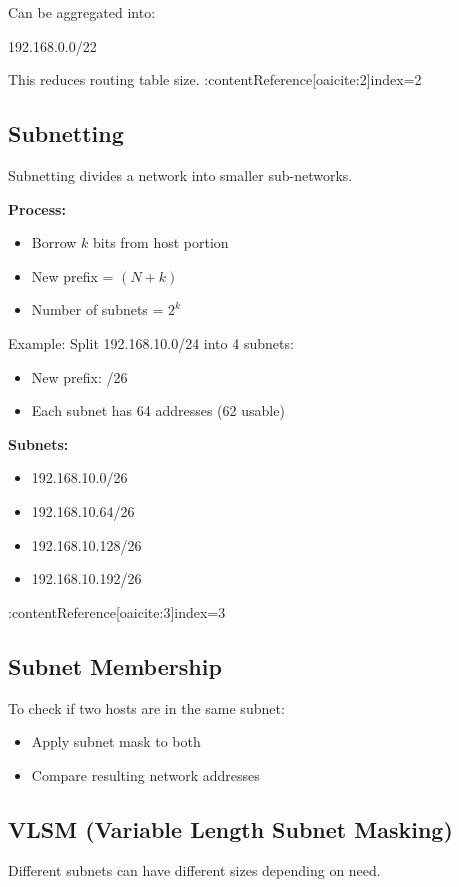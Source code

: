 Can be aggregated into:
\begin{center}
192.168.0.0/22
\end{center}

This reduces routing table size. :contentReference[oaicite:2]{index=2}

\subsection{Subnetting}
Subnetting divides a network into smaller sub-networks.

\textbf{Process:}
\begin{itemize}
    \item Borrow $k$ bits from host portion
    \item New prefix = $(N + k)$
    \item Number of subnets = $2^k$
\end{itemize}

Example: Split 192.168.10.0/24 into 4 subnets:
\begin{itemize}
    \item New prefix: /26
    \item Each subnet has 64 addresses (62 usable)
\end{itemize}

\textbf{Subnets:}
\begin{itemize}
    \item 192.168.10.0/26
    \item 192.168.10.64/26
    \item 192.168.10.128/26
    \item 192.168.10.192/26
\end{itemize} :contentReference[oaicite:3]{index=3}

\subsection{Subnet Membership}
To check if two hosts are in the same subnet:
\begin{itemize}
    \item Apply subnet mask to both
    \item Compare resulting network addresses
\end{itemize}

\subsection{VLSM (Variable Length Subnet Masking)}
Different subnets can have different sizes depending on need.

